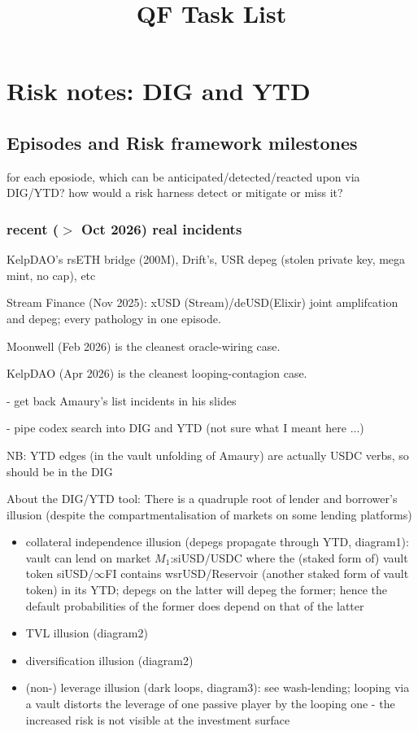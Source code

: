 \documentclass[12pt,oneside]{article}
\title{QF Task List}
\begin{document}
\maketitle
\Large


\section{Risk notes: DIG and YTD}


\subsection{Episodes and Risk framework milestones}


for each eposiode, which can be anticipated/detected/reacted upon via DIG/YTD?
how would a risk harness detect or mitigate or miss it?

\subsubsection{recent ($>$ Oct 2026) real incidents}

KelpDAO's rsETH bridge (200M), Drift's, USR depeg (stolen private key, mega mint, no cap), etc

Stream Finance (Nov 2025): xUSD (Stream)/deUSD(Elixir) joint amplifcation and depeg; every pathology in one episode. 

Moonwell (Feb 2026) is the cleanest oracle-wiring case. 

KelpDAO (Apr 2026) is the cleanest looping-contagion case.

- get back Amaury's list incidents in his slides

- pipe codex search into DIG and YTD (not sure what I meant here ...)

NB: YTD edges (in the vault unfolding of Amaury) are actually USDC verbs, so should be in the DIG

About the DIG/YTD tool: There is a quadruple root of lender and borrower's illusion (despite the compartmentalisation of markets on some lending platforms)
\begin{itemize}
  \item collateral independence illusion (depegs propagate through YTD, diagram1): vault can lend on market $M_1$:siUSD/USDC where the (staked form of) vault token siUSD/$\infty$FI 
  contains wsrUSD/Reservoir (another staked form of vault token) in its YTD; depegs on the latter will depeg the former; hence the
  default probabilities of the former does depend on that of the latter
  \item TVL illusion (diagram2)
  \item diversification illusion (diagram2)
  \item (non-) leverage illusion (dark loops, diagram3): see wash-lending; looping via a vault distorts the leverage of one passive player by the looping one - 
  the increased risk is not visible at the investment surface
\end{itemize}
\end{document}
